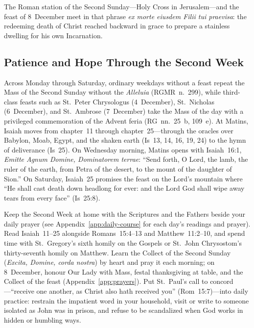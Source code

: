 The Roman station of the Second Sunday---Holy Cross in Jerusalem---and
the feast of 8~December meet in that phrase \textit{ex morte eiusdem
Filii tui praevisa}: the redeeming death of Christ reached backward in
grace to prepare a stainless dwelling for his own Incarnation.

\subsection{Patience and Hope Through the Second Week}

Across Monday through Saturday, ordinary weekdays without a feast repeat
the Mass of the Second Sunday without the \textit{Alleluia}
(RGMR~n.~299), while third-class feasts such as St.~Peter Chrysologus
(4~December), St.~Nicholas (6~December), and St.~Ambrose (7~December)
take the Mass of the day with a privileged commemoration of the Advent
feria (RG~nn.~25~b, 109~e). At Matins, Isaiah moves from chapter~11
through chapter~25---through the oracles over Babylon, Moab, Egypt, and
the shaken earth (Is~13, 14, 16, 19, 24) to the hymn of deliverance
(Is~25). On Wednesday morning, Matins opens with Isaiah~16:1,
\textit{Emitte Agnum Domine, Dominatorem terrae}: ``Send forth, O Lord,
the lamb, the ruler of the earth, from Petra of the desert, to the mount
of the daughter of Sion.'' On Saturday, Isaiah~25 promises the feast on
the Lord's mountain where ``He shall cast death down headlong for ever:
and the Lord God shall wipe away tears from every face'' (Is~25:8).

Keep the Second Week at home with the Scriptures and the Fathers beside
your daily prayer (see Appendix~\ref{app:daily-course} for each day's
readings and prayer). Read Isaiah~11--25 alongside Romans~15:4--13 and
Matthew~11:2--10, and spend time with St.~Gregory's sixth homily on the
Gospels or St.~John Chrysostom's thirty-seventh homily on Matthew.
Learn the Collect of the Second Sunday (\textit{Excita, Domine, corda
nostra}) by heart and pray it each morning; on 8~December, honour Our
Lady with Mass, festal thanksgiving at table, and the Collect of the
feast (Appendix~\ref{app:prayers}). Put St.~Paul's call to
concord---``receive one another, as Christ also hath received you''
(Rom~15:7)---into daily practice: restrain the impatient word in your
household, visit or write to someone isolated as John was in prison, and
refuse to be scandalized when God works in hidden or humbling ways.
